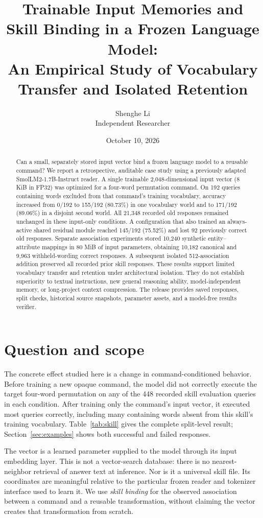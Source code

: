 \documentclass[11pt]{article}
\title{Trainable Input Memories and Skill Binding in a Frozen Language Model:\\An Empirical Study of Vocabulary Transfer and Isolated Retention}
\author{Shenghe Li\\Independent Researcher}
\date{October 10, 2026}
\begin{document}
\maketitle
\begin{abstract}
Can a small, separately stored input vector bind a frozen language model to a reusable command? We report a retrospective, auditable case study using a previously adapted SmolLM2-1.7B-Instruct reader. A single trainable 2,048-dimensional input vector (8 KiB in FP32) was optimized for a four-word permutation command. On 192 queries containing words excluded from that command's training vocabulary, accuracy increased from 0/192 to 155/192 (80.73\%) in one vocabulary world and to 171/192 (89.06\%) in a disjoint second world. All 21,348 recorded old responses remained unchanged in these input-only conditions. A configuration that also trained an always-active shared residual module reached 145/192 (75.52\%) and lost 92 previously correct old responses. Separate association experiments stored 10,240 synthetic entity--attribute mappings in 80 MiB of input parameters, obtaining 10,182 canonical and 9,963 withheld-wording correct responses. A subsequent isolated 512-association addition preserved all recorded prior skill responses. These results support limited vocabulary transfer and retention under architectural isolation. They do not establish superiority to textual instructions, new general reasoning ability, model-independent memory, or long-project context compression. The release provides saved responses, split checks, historical source snapshots, parameter assets, and a model-free results verifier.
\end{abstract}

\section{Question and scope}
The concrete effect studied here is a change in command-conditioned behavior. Before training a new opaque command, the model did not correctly execute the target four-word permutation on any of the 448 recorded skill evaluation queries in each condition. After training only the command's input vector, it executed most queries correctly, including many containing words absent from this skill's training vocabulary. Table~\ref{tab:skill} gives the complete split-level result; Section~\ref{sec:examples} shows both successful and failed responses.

The vector is a learned parameter supplied to the model through its input embedding layer. This is not a vector-search database: there is no nearest-neighbor retrieval of answer text at inference. Nor is it a universal skill file. Its coordinates are meaningful relative to the particular frozen reader and tokenizer interface used to learn it. We use \emph{skill binding} for the observed association between a command and a reusable transformation, without claiming the vector creates that transformation from scratch.
\end{document}
